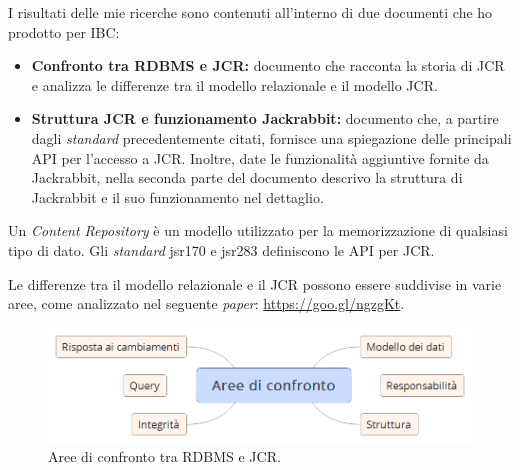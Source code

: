 		I risultati delle mie ricerche sono contenuti all'interno di due documenti che ho prodotto per IBC:
		\begin{itemize}
			\item \textbf{Confronto tra RDBMS e JCR:} documento che racconta la storia di JCR e analizza le differenze tra il modello relazionale e il modello JCR.
			\item \textbf{Struttura JCR e funzionamento Jackrabbit:} documento che, a partire dagli \textit{standard} precedentemente citati, fornisce una spiegazione delle principali API per l'accesso a JCR. Inoltre, date le funzionalità aggiuntive fornite da Jackrabbit, nella seconda parte del documento descrivo la struttura di Jackrabbit e il suo funzionamento nel dettaglio.
		\end{itemize}
		
		Un \textit{Content Repository} è un modello utilizzato per la memorizzazione di qualsiasi tipo di dato. Gli \textit{standard} \gls{jsr170} e \gls{jsr283} definiscono le API per JCR.
		
		Le differenze tra il modello relazionale e il JCR possono essere suddivise in varie aree, come analizzato nel seguente \textit{paper}:
		\url{https://goo.gl/ngzgKt}.
		
		\begin{figure}[H]
			\centering
			\includegraphics[scale=0.4]{immagini/aree-confronto}
			\caption{Aree di confronto tra RDBMS e JCR.}
		\end{figure}
		
